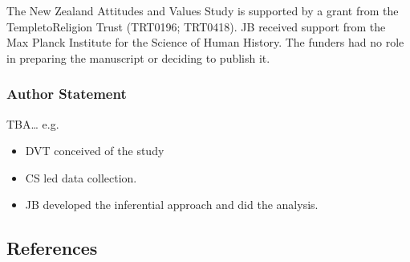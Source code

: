 \documentclass[
  singlecolumn]{article}
\providecommand{\tightlist}{%
  \setlength{\itemsep}{0pt}\setlength{\parskip}{0pt}}\usepackage{longtable,booktabs,array}
\begin{document}
The New Zealand Attitudes and Values Study is supported by a grant from
the TempletoReligion Trust (TRT0196; TRT0418). JB received support from
the Max Planck Institute for the Science of Human History. The funders
had no role in preparing the manuscript or deciding to publish it.

\subsubsection{Author Statement}\label{author-statement}

TBA\ldots{} e.g.~

\begin{itemize}
\tightlist
\item
  DVT conceived of the study
\item
  CS led data collection.
\item
  JB developed the inferential approach and did the analysis.
\end{itemize}

\newpage{}

\subsection{References}\label{references}
\end{document}
